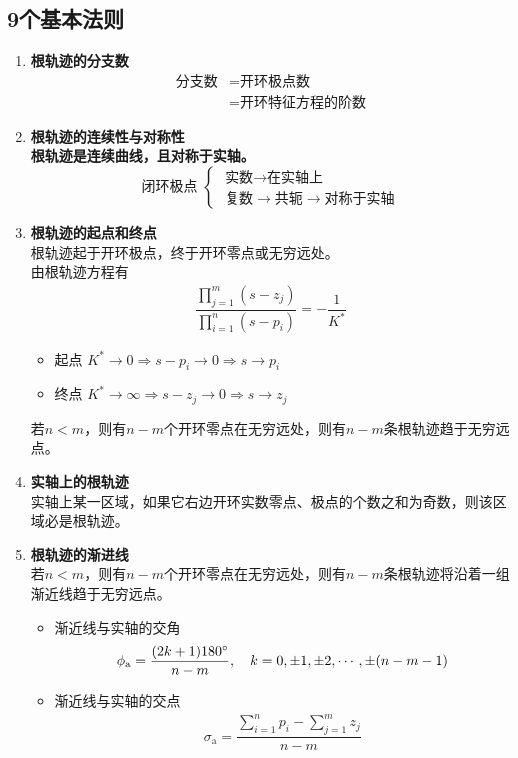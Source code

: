 \subsection{9个基本法则}
\begin{enumerate}
	\item \textbf{根轨迹的分支数}
	\begin{align*}
		\mbox{分支数} &= \mbox{开环极点数}\\
		&=\mbox{开环特征方程的阶数}
	\end{align*}
	\item \textbf{根轨迹的连续性与对称性}\\
	\textbf{根轨迹是连续曲线，且对称于实轴。}
	\begin{equation*}
		\mbox{闭环极点} \,\,
		\begin{cases}
			\,\,\mbox{实数} \longrightarrow \mbox{在实轴上}\\
			\,\,\mbox{复数} \longrightarrow \mbox{共轭} \longrightarrow \mbox{对称于实轴}
		\end{cases}
	\end{equation*}
	
	\item \textbf{根轨迹的起点和终点}\\
	根轨迹起于开环极点，终于开环零点或无穷远处。\\
	由根轨迹方程有
	\begin{align*}
		\dfrac{\displaystyle \prod_{j = 1}^{m}(s - z_j)}{\displaystyle \prod_{i = 1}^{n} (s - p_i)} = - \dfrac{1}{K^*}
	\end{align*}
	\begin{itemize}
		\item 起点 \quad $K^* \to 0 \Rightarrow s - p_i \to 0 \Rightarrow s \to p_i$
		\item 终点 \quad $K^* \to \infty \Rightarrow s - z_j \to 0 \Rightarrow s \to z_j$
	\end{itemize}
	若$n < m$，则有$n - m$个开环零点在无穷远处，则有$n - m$条根轨迹趋于无穷远点。
	\item \textbf{实轴上的根轨迹}\\
	实轴上某一区域，如果它右边开环实数零点、极点的个数之和为奇数，则该区域必是根轨迹。
	\item \textbf{根轨迹的渐进线}\\
	若$n < m$，则有$n - m$个开环零点在无穷远处，则有$n - m$条根轨迹将沿着一组渐近线趋于无穷远点。
	\begin{itemize}
		\item 渐近线与实轴的交角
		\begin{align}
			\phi_\text{a} = \dfrac{(2k+1) 180 {}^{\circ}}{n-m}, \quad k = 0,\pm 1,\pm 2, \cdots,\pm (n-m-1)
		\end{align}
		\item 渐近线与实轴的交点
		\begin{align}
			\sigma_\text{a} = \dfrac{\displaystyle \sum_{i =1}^n p_i - \sum_{j = 1}^m z_j}{n-m}
		\end{align}
	\end{itemize}
	

\end{enumerate}
